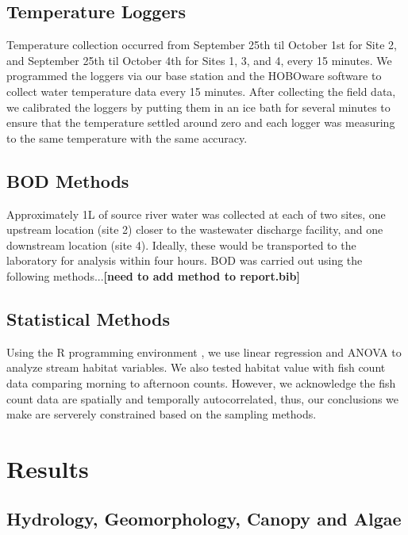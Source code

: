 \documentclass{article}\usepackage[]{graphicx}\usepackage[]{color}
\begin{document}
\subsection{Temperature Loggers}

Temperature collection occurred from September 25th til October 1st for Site 2, and September 25th til October 4th for Sites 1, 3, and 4, every 15 minutes. We programmed the loggers via our base station and the HOBOware software to collect water temperature data every 15 minutes. After collecting the field data, we calibrated the loggers by putting them in an ice bath for several minutes to ensure that the temperature settled around zero and each logger was measuring to the same temperature with the same accuracy.

\subsection{BOD Methods}

Approximately 1L of source river water was collected at each of two sites, one upstream location (site 2) closer to the wastewater discharge facility, and one downstream location (site 4). Ideally, these would be transported to the laboratory for analysis within four hours. BOD was carried out using the following methods...\textbf{[need to add method to report.bib]}

\subsection{Statistical Methods}

Using the R programming environment \citep{CRAN}, we use linear regression and ANOVA to analyze stream habitat variables. We also tested habitat value with fish count data comparing morning to afternoon counts. However, we acknowledge the fish count data are spatially and temporally autocorrelated, thus, our conclusions we make are serverely constrained based on the sampling methods.

\section{Results}



\subsection{Hydrology, Geomorphology, Canopy and Algae}
\end{document}
